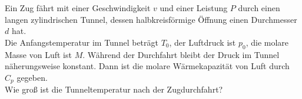 \begin{Exercise}[title = Tunnel, origin = {EstPhO 2009}, difficulty = 3, label = train]
	Ein Zug fährt mit einer Geschwindigkeit $v$ und einer Leistung $P$ durch einen langen zylindrischen Tunnel, dessen halbkreisförmige Öffnung einen Durchmesser $d$ hat.\\
	Die Anfangstemperatur im Tunnel beträgt $T_0$, der Luftdruck ist $p_0$, die molare Masse von Luft ist $M$. Während der Durchfahrt bleibt der Druck im Tunnel näherungsweise konstant. Dann ist die molare Wärmekapazität von Luft durch $C_p$ gegeben.\\
	Wie groß ist die Tunneltemperatur nach der Zugdurchfahrt?
\end{Exercise}